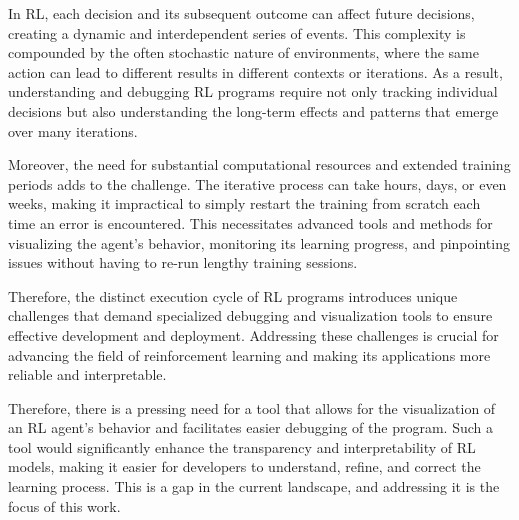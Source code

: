 In \ac{RL}, each decision and its subsequent outcome can affect future decisions, 
creating a dynamic and interdependent series of events. This complexity is 
compounded by the often stochastic nature of environments, where the same action 
can lead to different results in different contexts or iterations. As a result, 
understanding and debugging \ac{RL} programs require not only tracking individual 
decisions but also understanding the long-term effects and patterns that emerge 
over many iterations.

Moreover, the need for substantial computational resources and extended training 
periods adds to the challenge. The iterative process can take hours, days, or 
even weeks, making it impractical to simply restart the training from scratch 
each time an error is encountered. This necessitates advanced tools and methods 
for visualizing the agent's behavior, monitoring its learning progress, and 
pinpointing issues without having to re-run lengthy training sessions.

Therefore, the distinct execution cycle of \ac{RL} programs introduces unique 
challenges that demand specialized debugging and visualization tools to ensure 
effective development and deployment. Addressing these challenges is crucial 
for advancing the field of reinforcement learning and making its applications 
more reliable and interpretable.

Therefore, there is a pressing need for a tool that allows for the visualization 
of an \ac{RL} agent's behavior and facilitates easier debugging of the program. 
Such a tool would significantly enhance the transparency and interpretability 
of \ac{RL} models, making it easier for developers to understand, refine, and correct 
the learning process. This is a gap in the current landscape, and addressing it 
is the focus of this work.


\endinput

